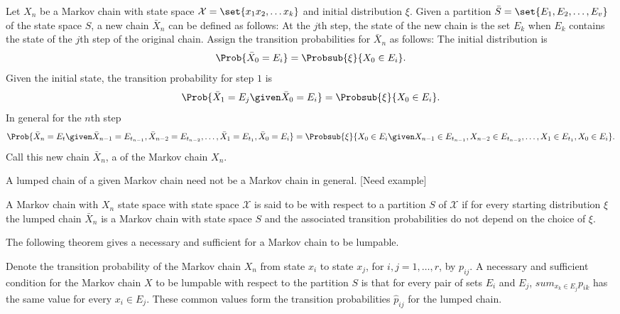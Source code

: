\documentclass[12pt]{article}
\begin{document}

\begin{definition}
    Let \( X_n \) be a Markov chain with state space \( \mathcal{X} =
    \set{x_1 x_2, \dots x_k} \) and initial distribution \( \xi \).
    Given a partition \( \bar{S} = \set{E_1, E_2, \dots, E_v} \) of the
    state space \( S \), a new chain \( \bar{X}_n \) can be defined as
    follows:  At the \( j \)th step, the state of the new chain is the
    set \( E_k \) when \( E_k \) contains the state of the \( j \)th
    step of the original chain.  Assign the transition probabilities for
    \( \bar{X}_n \) as follows: The initial distribution is
    \[
        \Prob{\bar{X}_0 = E_i} = \Probsub{\xi}{X_0 \in E_i}.
    \] Given the initial state, the transition probability for step \( 1
    \) is
    \[
        \Prob{\bar{X}_1 = E_j \given \bar{X}_0 = E_i} = \Probsub{\xi}{X_0
        \in E_i }.
    \] In general for the \( n \)th step
    \[
        \Prob{\bar{X}_n = E_t \given \bar{X}_{n-1} = E_{t_{n-1}}, \bar{X}_
        {n-2} = E_{t_{n-2}}, \dots, \bar{X}_1 = E_{t_1}, \bar{X}_0 = E_i}
        = \Probsub{\xi}{X_0 \in E_i \given X_{n-1} \in E_{t_{n-1}}, X_{n-2}
        \in E_{t_{n-2}}, \dots, X_1 \in E_{t_1}, X_0 \in E_i}.
    \] Call this new chain \( \bar{X}_n \), a %
    of the Markov chain \( X_n \).
\end{definition}

A lumped chain of a given Markov chain need not be a Markov chain in
general.  [Need example]

\begin{definition}
    A Markov chain with \( X_n \) state space with state space \(
    \mathcal{X} \) is said to be %
    with respect to a partition \( S \) of \( \mathcal{X} \) if for
    every starting distribution \( \xi \) the lumped chain \( \bar{X}_n \)
    is a Markov chain with state space \( S \) and the associated
    transition probabilities do not depend on the choice of \( \xi \).
\end{definition}

The following theorem gives a necessary and sufficient for a Markov
chain to be lumpable.

\begin{theorem}
    Denote the transition probability of the Markov chain \( X_n \) from
    state \( x_i \) to state \( x_j \), for \( i, j = 1, \dots, r \), by
    \( p_{ij} \).  A necessary and sufficient condition for the Markov
    chain \( X \) to be lumpable with respect to the partition \( S \)
    is that for every pair of sets \( E_i \) and \( E_j \), \( sum_{x_k
    \in E_j} p_{ik} \) has the same value for every \( x_i \in E_j \).
    These common values form the transition probabilities \( \hat{p}_{ij}
    \) for the lumped chain.
\end{theorem}
\end{document}
